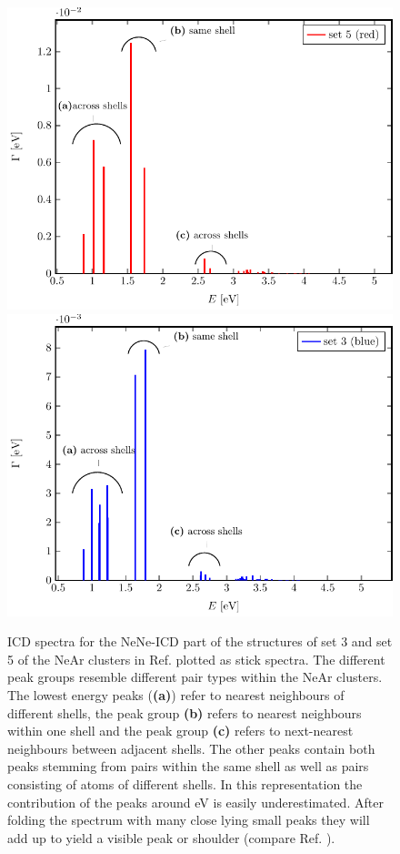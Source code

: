 \begin{figure}[h]
 \centering
 \includegraphics[width=0.7\columnwidth]{pics/rot.pdf}\\
 \includegraphics[width=0.7\columnwidth]{pics/blue.pdf}
 \caption{ICD spectra for the NeNe-ICD part of the structures of set 3 and
          set 5 of the NeAr clusters in Ref. \cite{Fasshauer14_1}
          plotted as stick spectra.
          The different peak groups resemble different pair types
          within the NeAr clusters. The lowest energy peaks (\textbf{(a)})
          refer to nearest neighbours
          of different shells, the peak group \textbf{(b)} refers
          to nearest neighbours within one shell and the peak group \textbf{(c)}
          refers to next-nearest neighbours between adjacent shells.
          The other peaks contain both peaks stemming from
          pairs within the same shell as well as pairs consisting of atoms
          of different shells. In this representation the contribution of the
          peaks around \unit[3]{eV} is easily underestimated. After folding the
          spectrum with many close lying small peaks they will add up to yield
          a visible peak or shoulder (compare Ref. \cite{Fasshauer14_1}).}
 \label{figure:rot_blue}
\end{figure}

